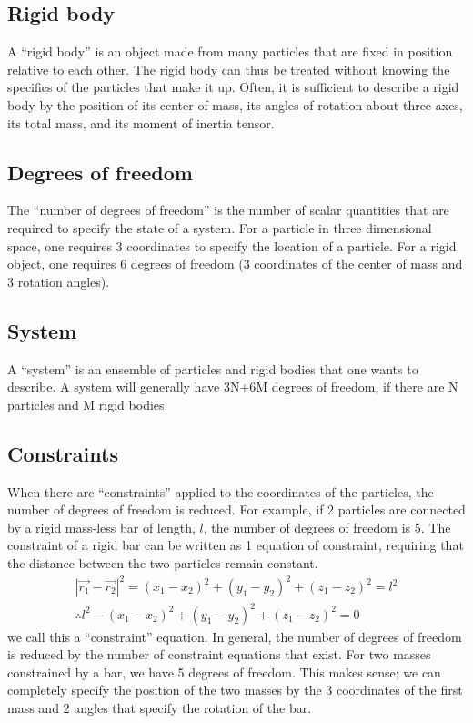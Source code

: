 \subsection{Rigid body}
A ``rigid body'' is an object made from many particles that are fixed in position relative to each other. The rigid body can thus be treated without knowing the specifics of the particles that make it up. Often, it is sufficient to describe a rigid body by the position of its center of mass, its angles of rotation about three axes, its total mass, and its moment of inertia tensor.

\subsection{Degrees of freedom}
The ``number of degrees of freedom'' is the number of scalar quantities that are required to specify the state of a system. For a particle in three dimensional space, one requires 3 coordinates to specify the location of a particle. For a rigid object, one requires 6 degrees of freedom (3 coordinates of the center of mass and 3 rotation angles).

\subsection{System}
A ``system'' is an ensemble of particles and rigid bodies that one wants to describe. A system will generally have 3N+6M degrees of freedom, if there are N particles and M rigid bodies.

\subsection{Constraints}
When there are ``constraints'' applied to the coordinates of the particles, the number of degrees of freedom is reduced. For example, if 2 particles are connected by a rigid mass-less bar of length, $l$, the number of degrees of freedom is 5. The constraint of a rigid bar can be written as 1 equation of constraint, requiring that the distance between the two particles remain constant.
\begin{align}
|\vec{r_1}-\vec{r_2}|^2=(x_1-x_2)^2+(y_1-y_2)^2+(z_1-z_2)^2=l^2\nonumber\\
\therefore l^2-(x_1-x_2)^2+(y_1-y_2)^2+(z_1-z_2)^2=0
\label{eqn:2massbarrholcons}
\end{align}
we call this a ``constraint'' equation. In general, the number of degrees of freedom is reduced by the number of constraint equations that exist. For two masses constrained by a bar, we have 5 degrees of freedom. This makes sense; we can completely specify the position of the two masses by the 3 coordinates of the first mass and 2 angles that specify the rotation of the bar.

